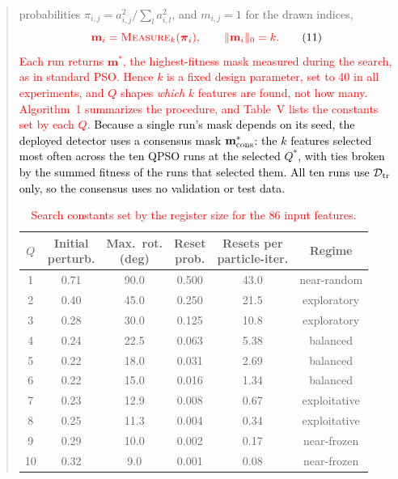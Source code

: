 \documentclass[11pt]{article}
\newenvironment{excerpt}{\begin{quote}\sloppy}{\end{quote}}
\begin{document}
\begin{excerpt}
{probabilities $\pi_{i,j}=a_{i,j}^{2}/\sum_{l}a_{i,l}^{2}$, and
$m_{i,j}=1$ for the drawn indices,}
\begin{equation}
\textcolor{red}{\mathbf{m}_i = \textsc{Measure}_k(\boldsymbol{\pi}_i),
\qquad \|\mathbf{m}_i\|_0 = k .}
\tag{11}
\end{equation}
\textcolor{red}{Each run returns $\mathbf{m}^{*}$, the
highest-fitness mask measured during the search, as in standard PSO.
Hence $k$ is a fixed design parameter, set to 40 in all experiments,
and $Q$ shapes \emph{which} $k$ features are found, not how many.
Algorithm~1 summarizes the procedure, and
Table~V lists the constants set by each $Q$.}
\textcolor{black}{Because a single run's mask depends on its
seed, the deployed detector uses a consensus mask
$\mathbf{m}^{*}_{\rm cons}$: the $k$ features selected most often
across the ten QPSO runs at the selected $Q^{*}$, with ties broken by
the summed fitness of the runs that selected them. All ten runs use
$\mathcal{D}_{\rm tr}$ only, so the consensus uses no validation or
test data.}

\setcounter{table}{4}
\begin{table}[H]
\centering
\scriptsize
\caption{\textcolor{red}{Search constants set by the
register size for the 86 input features.}}

\setlength{\tabcolsep}{4pt}
\renewcommand{\arraystretch}{1.05}
\color{red}
\begin{adjustbox}{max width=\linewidth}
\begin{tabular}{cccccc}
\hline\toprule
$Q$ & \makecell{Initial\\perturb.} & \makecell{Max.\ rot.\\(deg)} & \makecell{Reset\\prob.} & \makecell{Resets per\\particle-iter.} & Regime \\
\hline\toprule
1  & 0.71 & 90.0 & 0.500  & 43.0 & near-random \\
2  & 0.40 & 45.0 & 0.250  & 21.5 & exploratory \\
3  & 0.28 & 30.0 & 0.125  & 10.8 & exploratory \\
4  & 0.24 & 22.5 & 0.063  & 5.38 & balanced \\
5  & 0.22 & 18.0 & 0.031  & 2.69 & balanced \\
6  & 0.22 & 15.0 & 0.016  & 1.34 & balanced \\
7  & 0.23 & 12.9 & 0.008  & 0.67 & exploitative \\
8  & 0.25 & 11.3 & 0.004  & 0.34 & exploitative \\
9  & 0.29 & 10.0 & 0.002  & 0.17 & near-frozen \\
10 & 0.32 & 9.0  & 0.001  & 0.08 & near-frozen \\
\hline\toprule
\end{tabular}
\end{adjustbox}
\end{table}


\end{excerpt}
\end{document}
